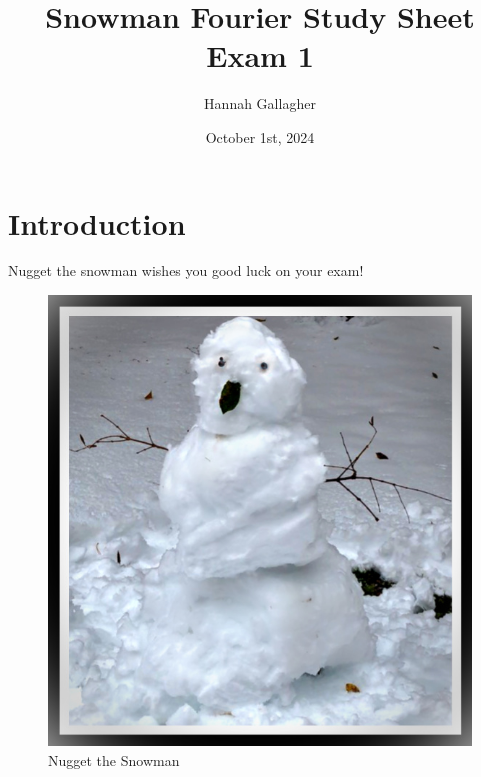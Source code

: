 \documentclass{article}
\title{Snowman Fourier Study Sheet Exam 1}
\author{Hannah Gallagher}
\date{October 1st, 2024}
\begin{document}
\maketitle

\section{Introduction}




Nugget the snowman wishes you good luck on your exam!

\begin{figure}[h!]
\centering
\includegraphics[scale=1]{Nugget.jpg}
\caption{Nugget the Snowman}
\label{fig:Nugget}
\end{figure}
\end{document}
